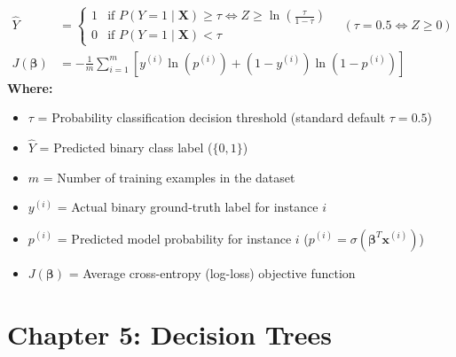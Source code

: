 \begin{formulabox}
\begin{align*}
    \hat{Y} &= \begin{cases} 1 & \text{if } P(Y=1 \mid \mathbf{X}) \ge \tau \iff Z \ge \ln\left(\frac{\tau}{1 - \tau}\right) \\ 0 & \text{if } P(Y=1 \mid \mathbf{X}) < \tau \end{cases} \quad (\tau = 0.5 \iff Z \ge 0) \\[2pt]
    J(\boldsymbol{\beta}) &= -\frac{1}{m} \sum_{i=1}^m \left[ y^{(i)} \ln(p^{(i)}) + (1 - y^{(i)}) \ln(1 - p^{(i)}) \right]
\end{align*}
\textbf{Where:}
\begin{itemize}[noitemsep, topsep=1pt]
    \item $\tau$ = Probability classification decision threshold (standard default $\tau = 0.5$)
    \item $\hat{Y}$ = Predicted binary class label ($\{0, 1\}$)
    \item $m$ = Number of training examples in the dataset
    \item $y^{(i)}$ = Actual binary ground-truth label for instance $i$
    \item $p^{(i)}$ = Predicted model probability for instance $i$ ($p^{(i)} = \sigma(\boldsymbol{\beta}^T \mathbf{x}^{(i)})$)
    \item $J(\boldsymbol{\beta})$ = Average cross-entropy (log-loss) objective function
\end{itemize}
\end{formulabox}

\section*{Chapter 5: Decision Trees}

